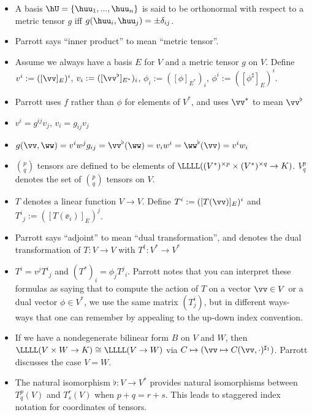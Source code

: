 \begin{itemize}
	\item A basis $\hU = \{\huu_1, ..., \huu_n\}$ is said to be orthonormal with respect to a metric tensor $g$ iff $g(\huu_i, \huu_j) = \pm \delta_{ij}$.
	
	\item Parrott says ``inner product'' to mean ``metric tensor''.
	
	\item Assume we always have a basis $E$ for $V$ and a metric tensor $g$ on $V$. Define $v^i := ([\vv]_E)^i$, $v_i := ([\vv^\flat]_{E^*})_i$, $\phi_i := ([\phi]_{E^*})_i$, $\phi^i := ([\phi^\sharp]_E)^i$. 
	
	\item Parrott uses $f$ rather than $\phi$ for elements of $V^*$, and uses $\vv^*$ to mean $\vv^\flat$
	
	\item $v^i = g^{ij} v_j$, $v_i = g_{ij} v_j$
	
	\item $g(\vv, \ww) = v^i w^j g_{ij} = \vv^\flat(\ww) = v_i w^i = \ww^\flat(\vv) = v^i w_i$
	
	\item $\binom{p}{q}$ tensors are defined to be elements of $\LLLL((V^*)^{\times p} \times (V^*)^{\times q} \rightarrow K)$. $V^p_q$ denotes the set of $\binom{p}{q}$ tensors on $V$.
	
	\item $T$ denotes a linear function $V \rightarrow V$. Define $T^i := ([T(\vv)]_E)^i$ and $T^i{}_j := ([T(\ee_i)]_E)^j$.
	
	\item Parrott says ``adjoint'' to mean ``dual transformation'', and denotes the dual transformation of $T:V \rightarrow V$ with $T^\dag:V^* \rightarrow V^*$
	
	\item $T^i = v^j T^i{}_j$ and $(T^*)_i = \phi_j T^j{}_i$. Parrott notes that you can interpret these formulas as saying that to compute the action of $T$ on a vector $\vv \in V$ or a dual vector $\phi \in V^*$, we use the same matrix $(T^i_j)$, but in different ways- ways that one can remember by appealing to the up-down index convention.
	
	\item If we have a nondegenerate bilinear form $B$ on $V$ and $W$, then $\LLLL(V \times W \rightarrow K) \cong \LLLL(V \rightarrow W)$ via $C \mapsto (\vv \mapsto C(\vv, \cdot)^{\sharp_1})$. Parrott discusses the case $V = W$.
	
	\item The natural isomorphism $\flat:V \rightarrow V^*$ provides natural isomorphisms between $T^p_q(V)$ and $T^r_s(V)$ when $p + q = r + s$. This leads to staggered index notation for coordinates of tensors.
\end{itemize}

